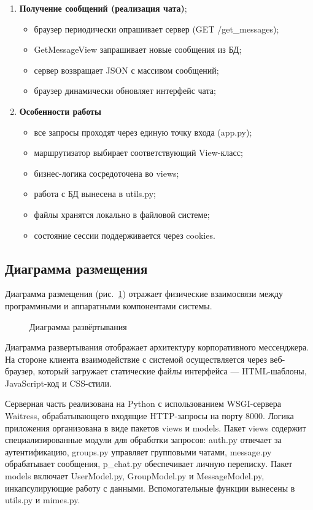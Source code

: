 \begin{enumerate}[leftmargin=*,label=\textbf{\arabic*.}]
	\item \textbf{Получение сообщений (реализация чата)};
	\begin{itemize}
		\item браузер периодически опрашивает сервер (GET /get\_messages);
		\item GetMessageView запрашивает новые сообщения из БД;
		\item сервер возвращает JSON с массивом сообщений;
		\item браузер динамически обновляет интерфейс чата;
	\end{itemize}
	
	\item \textbf{Особенности работы}
	\begin{itemize}
		\item все запросы проходят через единую точку входа (app.py);
		\item маршрутизатор выбирает соответствующий View-класс;
		\item бизнес-логика сосредоточена во views;
		\item работа с БД вынесена в utils.py;
		\item файлы хранятся локально в файловой системе;
		\item состояние сессии поддерживается через cookies.
	\end{itemize}
\end{enumerate}

\subsection{Диаграмма размещения}

Диаграмма размещения (рис.~\ref{place:image}) отражает физические взаимосвязи между программными и аппаратными компонентами системы.

\begin{figure}[ht]
\caption{Диаграмма развёртывания}
\label{place:image}
\end{figure}

Диаграмма развертывания отображает архитектуру корпоративного мессенджера. На стороне клиента взаимодействие с системой осуществляется через веб-браузер, который загружает статические файлы интерфейса — HTML-шаблоны, JavaScript-код и CSS-стили.

Серверная часть реализована на Python с использованием WSGI-сервера Waitress, обрабатывающего входящие HTTP-запросы на порту 8000. Логика приложения организована в виде пакетов views и models. Пакет views содержит специализированные модули для обработки запросов: auth.py отвечает за аутентификацию, groups.py управляет групповыми чатами, message.py обрабатывает сообщения, p\_chat.py обеспечивает личную переписку. Пакет models включает UserModel.py, GroupModel.py и MessageModel.py, инкапсулирующие работу с данными. Вспомогательные функции вынесены в utils.py и mimes.py.

